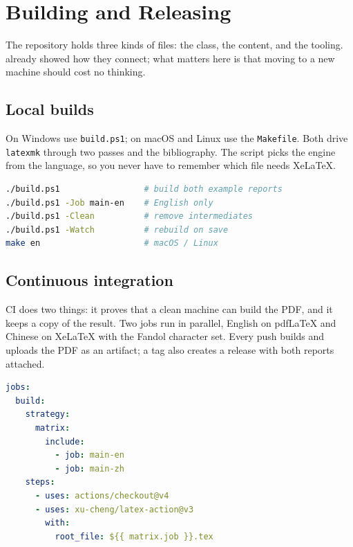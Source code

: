 \section{Building and Releasing}
\label{sec:build}

The repository holds three kinds of files: the class, the content, and the tooling.
 already showed how they connect; what matters here is that moving to a
new machine should cost no thinking.

\subsection{Local builds}

On Windows use \texttt{build.ps1}; on macOS and Linux use the \texttt{Makefile}. Both
drive \texttt{latexmk} through two passes and the bibliography. The script picks the
engine from the language, so you never have to remember which file needs XeLaTeX.

\begin{lstlisting}[language=bash,
  caption={Common build commands. With \texttt{-Job}, only one report is built.},
  label={lst:build}]
./build.ps1                 # build both example reports
./build.ps1 -Job main-en    # English only
./build.ps1 -Clean          # remove intermediates
./build.ps1 -Watch          # rebuild on save
make en                     # macOS / Linux
\end{lstlisting}

\subsection{Continuous integration}

CI does two things: it proves that a clean machine can build the PDF, and it keeps a copy
of the result. Two jobs run in parallel, English on pdfLaTeX and Chinese on XeLaTeX with
the Fandol character set. Every push builds and uploads the PDF as an artifact; a tag also
creates a release with both reports attached.

\begin{lstlisting}[language=yaml,
  caption={The essential CI fragment. The Chinese job injects \texttt{fandol} through \texttt{\textbackslash PassOptionsToClass} so it never depends on host fonts.},
  label={lst:ci}]
jobs:
  build:
    strategy:
      matrix:
        include:
          - job: main-en
          - job: main-zh
    steps:
      - uses: actions/checkout@v4
      - uses: xu-cheng/latex-action@v3
        with:
          root_file: ${{ matrix.job }}.tex
\end{lstlisting}

